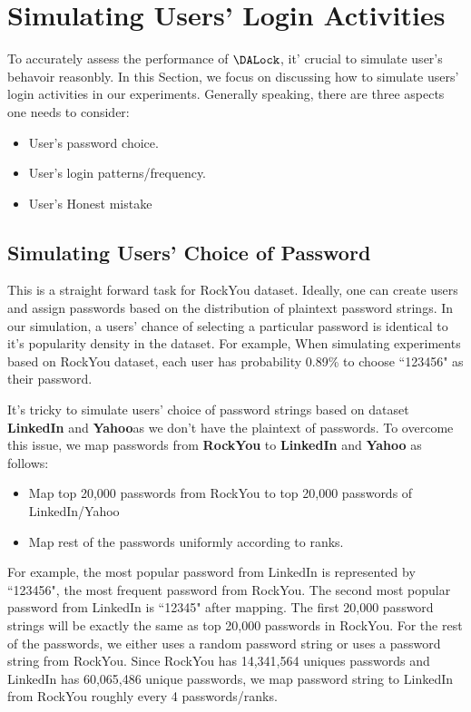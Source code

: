 \section{Simulating Users' Login Activities} \label{sec:simulateUsers}
To accurately assess the performance of $\DALock$, it' crucial to simulate user's behavoir reasonbly.  In this Section, we focus on discussing how to simulate users' login activities in our experiments. Generally speaking, there are three aspects one needs to consider:
\begin{itemize}
	\item User's password choice.
	\item User's login patterns/frequency.
	\item User's Honest mistake
\end{itemize}



\subsection{Simulating Users' Choice of Password}

This is a straight forward task for RockYou dataset. Ideally, one can create users and assign passwords based on the distribution of plaintext password strings. In our simulation, a users' chance of selecting a particular password is identical to it's popularity density in the dataset. For example, When simulating experiments based on RockYou dataset, each user has probability 0.89\% to choose ``123456" as their password. 

 It's tricky to simulate users' choice of password strings based on dataset \textbf{LinkedIn} and \textbf{Yahoo}as we don't have the plaintext of passwords. To overcome this issue, we map passwords from \textbf{RockYou} to \textbf{LinkedIn} and \textbf{Yahoo} as follows:

\begin{itemize}
	\item Map top 20,000 passwords from RockYou to top 20,000 passwords of LinkedIn/Yahoo
	\item Map rest of the passwords uniformly according to ranks.
\end{itemize}

For example, the most popular password from LinkedIn is represented by ``123456", the most frequent password from RockYou. The second most popular password from LinkedIn is ``12345" after mapping. The first 20,000 password strings will be exactly the same as top 20,000 passwords in RockYou. For the rest of the passwords, we either uses a random password string or uses a password string from RockYou. Since  RockYou has 14,341,564 uniques passwords and LinkedIn has 60,065,486 unique passwords, we map password string to LinkedIn from RockYou roughly every 4 passwords/ranks. 

